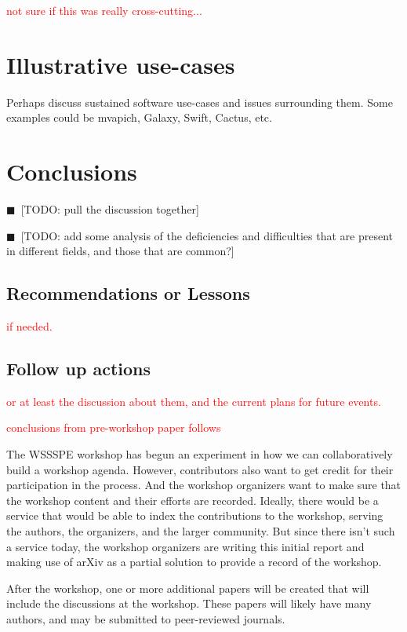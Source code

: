 \documentclass[11pt, oneside]{amsart}
\newcommand{\todo}[1]{{\color{blue}$\blacksquare$~\textsf{[TODO: #1]}}}
\newcommand{\note}[1]{ {\textcolor{red}    { #1 }}}
\begin{document}
\note{not sure if this was really cross-cutting...}


\section{Illustrative use-cases}

Perhaps discuss sustained software use-cases and issues surrounding them. Some examples could be mvapich, Galaxy, Swift, Cactus, etc.

\section{Conclusions}

\todo{pull the discussion together}

\todo{add some analysis of the deficiencies and difficulties that are present in different fields, and those that are common?}

\subsection{Recommendations or Lessons}

\note{if needed.}

\subsection{Follow up actions}

\note{or at least the discussion about them, and the current plans for future events.}

\note{conclusions from pre-workshop paper follows}

The WSSSPE workshop has begun an experiment in how we can collaboratively build a workshop 
agenda. However, contributors also want to get credit for their participation in the process. And the 
workshop organizers want to make sure that the workshop content and their efforts are recorded. 
Ideally, there would be a service that would be able to index the contributions to the workshop, 
serving the authors, the organizers, and the larger community. But since there isn't such a service 
today, the workshop organizers are writing this initial report and making use of arXiv as a partial 
solution to provide a record of the workshop.

After the workshop, one or more additional papers will be created that will include the discussions at 
the workshop. These papers will likely have many authors, and may be submitted to peer-reviewed 
journals.
\end{document}
